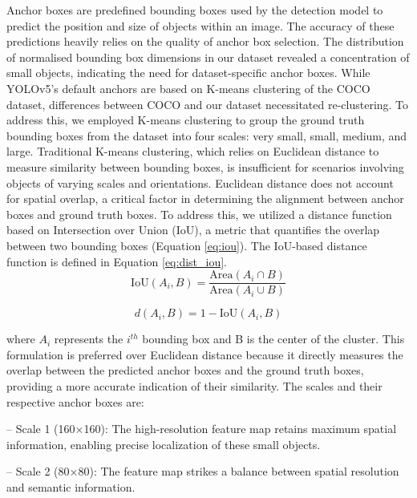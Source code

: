 \documentclass[preprint,review,12pt]{elsarticle}
\begin{document}
Anchor boxes are predefined bounding boxes used by the detection model to predict the position and size of objects within an image. The accuracy of these predictions heavily relies on the quality of anchor box selection. The distribution of normalised bounding box dimensions in our dataset revealed a concentration of small objects, indicating the need for dataset-specific anchor boxes. While YOLOv5's default anchors are based on K-means clustering of the COCO dataset, differences between COCO and our dataset necessitated re-clustering. To address this, we employed K-means clustering to group the ground truth bounding boxes from the dataset into four scales: very small, small, medium, and large. 
Traditional K-means clustering, which relies on Euclidean distance to measure similarity between bounding boxes, is insufficient for scenarios involving objects of varying scales and orientations. Euclidean distance does not account for spatial overlap, a critical factor in determining the alignment between anchor boxes and ground truth boxes. To address this, we utilized a distance function based on Intersection over Union (IoU), a metric that quantifies the overlap between two bounding boxes (Equation \eqref{eq:iou}). The IoU-based distance function is defined in Equation \eqref{eq:dist_iou}.
\begin{equation}
\text{IoU}(A_i, B) = \frac{\text{Area}(A_i \cap B)}{\text{Area}(A_i \cup B)}
\label{eq:iou}
\end{equation}

\begin{equation}
d(A_i, B) = 1 - \text{IoU}(A_i, B)
\label{eq:dist_iou}
\end{equation}

where $A_i$ represents the $i^{th}$ bounding box and B is the center of the cluster. This formulation is preferred over Euclidean distance because it directly measures the overlap between the predicted anchor boxes and the ground truth boxes, providing a more accurate indication of their similarity.  The scales and their respective anchor boxes are:

\noindent -- {Scale 1 (160×160):} The high-resolution feature map retains maximum spatial information, enabling precise localization of these small objects.

\noindent -- {Scale 2 (80×80):} The feature map strikes a balance between spatial resolution and semantic information.
\end{document}
